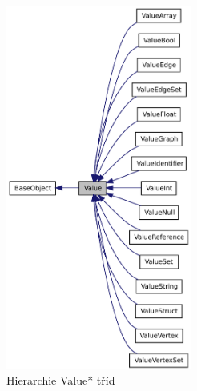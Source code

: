 \documentclass[11pt,twoside,a4paper]{book}
\begin{document}
\begin{figure}[ht]
\begin{center}
\includegraphics[height=12cm]{img/classValue__inherit__graph.pdf}
\caption{Hierarchie Value* tříd}
\label{fig:value_hierarchy}
\end{center}
\end{figure}


\end{document}
